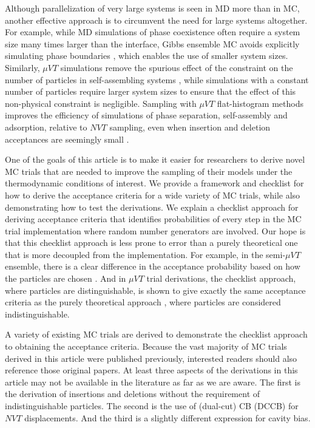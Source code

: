 \documentclass[
  9pt,
  bestpractices,
  pubversion,
]{livecoms}
\begin{document}
Although parallelization of very large systems is seen in MD more than in MC, another effective approach is to circumvent the need for large systems altogether.
For example, while MD simulations of phase coexistence often require a system size many times larger than the interface, Gibbs ensemble MC avoids explicitly simulating phase boundaries \cite{panagiotopoulos_direct_1987}, which enables the use of smaller system sizes.
Similarly, $\mu VT$ simulations remove the spurious effect of the constraint on the number of particles in self-assembling systems \cite{floriano_micellization_1999, hatch_computational_2015}, while simulations with a constant number of particles require larger system sizes to ensure that the effect of this non-physical constraint is negligible.
Sampling with $\mu VT$ flat-histogram methods improves the efficiency of simulations of phase separation, self-assembly and adsorption, relative to $NVT$ sampling, even when insertion and deletion acceptances are seemingly small \cite{hatch_efficiency_2023}.

One of the goals of this article is to make it easier for researchers to derive novel MC trials that are needed to improve the sampling of their models under the thermodynamic conditions of interest.
We provide a framework and checklist for how to derive the acceptance criteria for a wide variety of MC trials, while also demonstrating how to test the derivations.
We explain a checklist approach for deriving acceptance criteria that identifies probabilities of every step in the MC trial implementation where random number generators are involved.
Our hope is that this checklist approach is less prone to error than a purely theoretical one that is more decoupled from the implementation.
For example, in the semi-$\mu VT$ ensemble, there is a clear difference in the acceptance probability based on how the particles are chosen \cite{kofke_monte_1988}.
And in $\mu VT$ trial derivations, the checklist approach, where particles are distinguishable, is shown to give exactly the same acceptance criteria as the purely theoretical approach \cite{frenkel_understanding_2002}, where particles are considered indistinguishable.

A variety of existing MC trials are derived to demonstrate the checklist approach to obtaining the acceptance criteria.
Because the vast majority of MC trials derived in this article were published previously, interested readers should also reference those original papers.
At least three aspects of the derivations in this article may not be available in the literature as far as we are aware.
The first is the derivation of insertions and deletions without the requirement of indistinguishable particles.
The second is the use of (dual-cut) CB (DCCB) \cite{vlugt_improving_1998} for $NVT$ displacements.
And the third is a slightly different expression for cavity bias.
\end{document}
